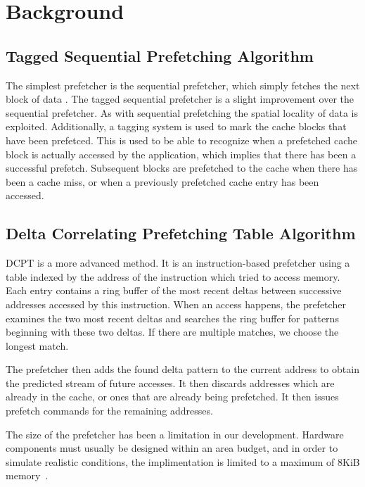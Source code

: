 \section{Background}

\subsection*{Tagged Sequential Prefetching Algorithm}
The simplest prefetcher is the sequential prefetcher, which simply fetches the next block of data \citep{seq}.
The tagged sequential prefetcher is a slight improvement over the sequential
prefetcher. As with sequential prefetching the spatial locality of data is
exploited. Additionally, a tagging system is used to mark the cache blocks that
have been prefetced. This is used to be able to recognize when a prefetched
cache block is actually accessed by the application, which implies that there
has been a successful prefetch. Subsequent blocks are prefetched to the cache
when there has been a cache miss, or when a previously prefetched cache entry
has been accessed\cite{grannaes}.

\subsection*{Delta Correlating Prefetching Table Algorithm}

DCPT is a more advanced method. It is an instruction-based prefetcher using a
table indexed by the address of the instruction which tried to access memory.
Each entry contains a ring buffer of the most recent deltas between successive
addresses accessed by this instruction. When an access happens, the prefetcher
examines the two most recent deltas and searches the ring buffer for patterns
beginning with these two deltas. If there are multiple matches, we choose the
longest match.

The prefetcher then adds the found delta pattern to the current address to
obtain the predicted stream of future accesses. It then discards addresses which
are already in the cache, or ones that are already being prefetched. It then
issues prefetch commands for the remaining addresses.


The size of the prefetcher has been a limitation in our development. Hardware
components must usually be designed within an area budget, and in order to
simulate realistic conditions, the implimentation is limited to a maximum of
8KiB memory~\cite{guidelines}.

